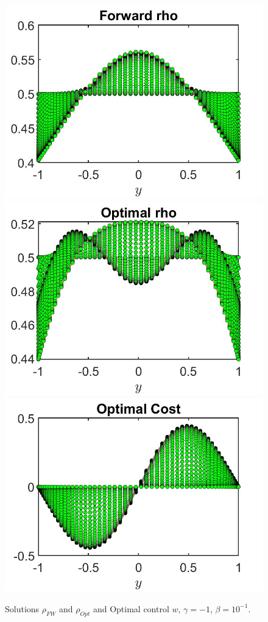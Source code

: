 \documentclass[11pt, a4paper]{article}
\theoremstyle{definition}
\begin{document}
\begin{figure}[h]
	\includegraphics[scale=0.3]{rhoFW01a.jpg}
	\includegraphics[scale=0.3]{rhoOpt01a.jpg}
	\includegraphics[scale=0.3]{wOpt01a.jpg}
	\caption{Solutions $\rho_{FW}$ and $\rho_{Opt}$ and Optimal control $w$, $\gamma = - 1$, $\beta = 10^{-1}$.}
	\label{rho01a}
\end{figure}
\end{document}
